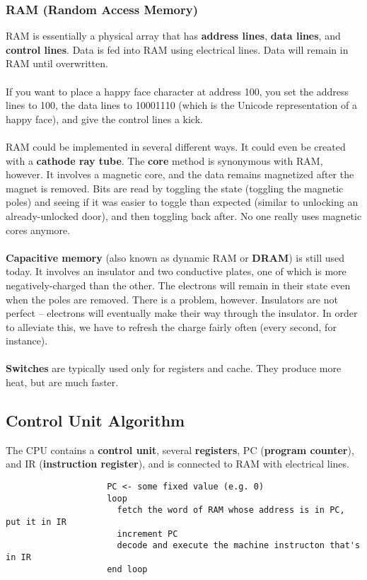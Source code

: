 \documentclass[]{article}
\theoremstyle{definition}
\begin{document}
			\subsubsection{RAM (Random Access Memory)}
				RAM is essentially a physical array that has \textbf{address lines}, \textbf{data lines}, and \textbf{control lines}. Data is fed into RAM using electrical lines. Data will remain in RAM until overwritten.
				\\ \\
				If you want to place a happy face character at address 100, you set the address lines to 100, the data lines to 10001110 (which is the Unicode representation of a happy face), and give the control lines a kick.
				\\ \\
				RAM could be implemented in several different ways. It could even be created with a \textbf{cathode ray tube}. The \textbf{core} method is synonymous with RAM, however. It involves a magnetic core, and the data remains magnetized after the magnet is removed. Bits are read by toggling the state (toggling the magnetic poles) and seeing if it was easier to toggle than expected (similar to unlocking an already-unlocked door), and then toggling back after. No one really uses magnetic cores anymore.
				\\ \\
				\textbf{Capacitive memory} (also known as dynamic RAM or \textbf{DRAM}) is still used today. It involves an insulator and two conductive plates, one of which is more negatively-charged than the other. The electrons will remain in their state even when the poles are removed. There is a problem, however. Insulators are not perfect -- electrons will eventually make their way through the insulator. In order to alleviate this, we have to refresh the charge fairly often (every second, for instance).
				\\ \\
				\textbf{Switches} are typically used only for registers and cache. They produce more heat, but are much faster.
			\subsection{Control Unit Algorithm}
				The CPU contains a \textbf{control unit}, several \textbf{registers}, PC (\textbf{program counter}), and IR (\textbf{instruction register}), and is connected to RAM with electrical lines.
				\begin{verbatim}
					PC <- some fixed value (e.g. 0)
					loop
					  fetch the word of RAM whose address is in PC, put it in IR
					  increment PC
					  decode and execute the machine instructon that's in IR
					end loop
				\end{verbatim}
\end{document}
